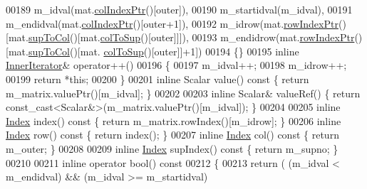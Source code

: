 \begin{DoxyCode}
00189         m\_idval(mat.\hyperlink{group___sparse_l_u___module_a87c0272aedd8ee01d4245bd719738b5d}{colIndexPtr}()[outer]),
00190         m\_startidval(m\_idval),
00191         m\_endidval(mat.\hyperlink{group___sparse_l_u___module_a87c0272aedd8ee01d4245bd719738b5d}{colIndexPtr}()[outer+1]),
00192         m\_idrow(mat.\hyperlink{group___sparse_l_u___module_a826186a823bf49f81b20673cce741250}{rowIndexPtr}()[mat.\hyperlink{group___sparse_l_u___module_ab2b1bdd663288f1f2af09ec42a0a62a5}{supToCol}()[mat.\hyperlink{group___sparse_l_u___module_a1e2c012b63809715188aa7f0c722868d}{colToSup}()[outer]]]),
00193         m\_endidrow(mat.\hyperlink{group___sparse_l_u___module_a826186a823bf49f81b20673cce741250}{rowIndexPtr}()[mat.\hyperlink{group___sparse_l_u___module_ab2b1bdd663288f1f2af09ec42a0a62a5}{supToCol}()[mat.
      \hyperlink{group___sparse_l_u___module_a1e2c012b63809715188aa7f0c722868d}{colToSup}()[outer]]+1])
00194     \{\}
00195     \textcolor{keyword}{inline} \hyperlink{class_eigen_1_1internal_1_1_mapped_super_nodal_matrix_1_1_inner_iterator}{InnerIterator}& operator++()
00196     \{ 
00197       m\_idval++; 
00198       m\_idrow++;
00199       \textcolor{keywordflow}{return} *\textcolor{keyword}{this};
00200     \}
00201     \textcolor{keyword}{inline} Scalar value()\textcolor{keyword}{ const }\{ \textcolor{keywordflow}{return} m\_matrix.valuePtr()[m\_idval]; \}
00202     
00203     \textcolor{keyword}{inline} Scalar& valueRef() \{ \textcolor{keywordflow}{return} \textcolor{keyword}{const\_cast<}Scalar&\textcolor{keyword}{>}(m\_matrix.valuePtr()[m\_idval]); \}
00204     
00205     \textcolor{keyword}{inline} \hyperlink{namespace_eigen_a62e77e0933482dafde8fe197d9a2cfde}{Index} index()\textcolor{keyword}{ const }\{ \textcolor{keywordflow}{return} m\_matrix.rowIndex()[m\_idrow]; \}
00206     \textcolor{keyword}{inline} \hyperlink{namespace_eigen_a62e77e0933482dafde8fe197d9a2cfde}{Index} row()\textcolor{keyword}{ const }\{ \textcolor{keywordflow}{return} index(); \}
00207     \textcolor{keyword}{inline} \hyperlink{namespace_eigen_a62e77e0933482dafde8fe197d9a2cfde}{Index} col()\textcolor{keyword}{ const }\{ \textcolor{keywordflow}{return} m\_outer; \}
00208     
00209     \textcolor{keyword}{inline} \hyperlink{namespace_eigen_a62e77e0933482dafde8fe197d9a2cfde}{Index} supIndex()\textcolor{keyword}{ const }\{ \textcolor{keywordflow}{return} m\_supno; \}
00210     
00211     \textcolor{keyword}{inline} \textcolor{keyword}{operator} bool()\textcolor{keyword}{ const }
00212 \textcolor{keyword}{    }\{ 
00213       \textcolor{keywordflow}{return} ( (m\_idval < m\_endidval) && (m\_idval >= m\_startidval)

\end{DoxyCode}
